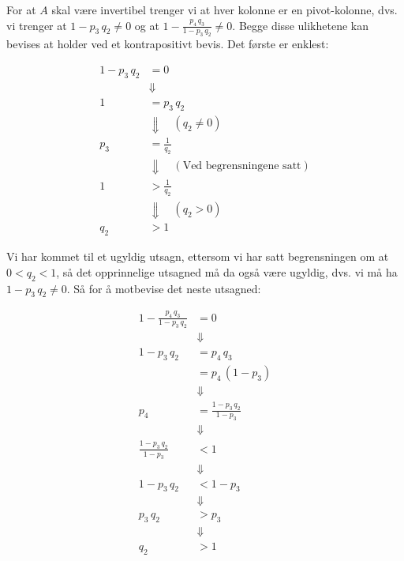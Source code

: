 \documentclass{article}[norsk]
\begin{document}
\begin{enumerate}[label=\alph*)]
For at $A$ skal være invertibel trenger vi at hver kolonne er en pivot-kolonne, dvs. vi trenger at $1 - p_3 \, q_ 2 \neq 0$ og at $1 - \frac{p_4 \, q_3}{1 - p_3 \, q_2} \neq 0$. Begge disse ulikhetene kan bevises at holder ved et kontrapositivt bevis. Det første er enklest:

\begin{equation*}
\begin{aligned}
	1 - p_3 \, q_2 &= 0\\
    &\Downarrow\\
   1& = p_3 \, q_2\\
   &\Downarrow\quad\left(q_2 \neq 0\right)\\
   p_3 &= \frac{1}{q_2}\\
   &\Downarrow\quad\left(\text{Ved begrensningene satt}\right)\\
   1 &> \frac{1}{q_2}\\
   &\Downarrow\quad\left(q_2 > 0\right)\\
   q_2 &> 1
\end{aligned}
\end{equation*}

Vi har kommet til et ugyldig utsagn, ettersom vi har satt begrensningen om at $0 < q_2 < 1$, så det opprinnelige utsagned må da også være ugyldig, dvs. vi må ha $1 - p_3 \, q_2 \neq 0$. Så for å motbevise det neste utsagned:

\begin{equation*} \begin{aligned}
	1 - \frac{p_4 \, q_3}{1 - p_3 \, q_2} &= 0\\
    &\Downarrow\\
    1 - p_3 \, q_2 &= p_4 \, q_3\\
  &= p_4 \, (1 - p_3)\\
  &\Downarrow\\
  p_4 &= \frac{1 - p_3 \, q_2}{1 - p_3}\\
  &\Downarrow\\
  \frac{1 - p_3 \, q_2}{1 - p_3} &< 1\\
  &\Downarrow\\
  1 - p_3 \, q_2 &< 1 - p_3\\
  &\Downarrow\\
  p_3 \, q_2 &> p_3\\
  &\Downarrow\\
  q_2 &> 1
\end{aligned} \end{equation*}


\end{enumerate}
\end{document}
